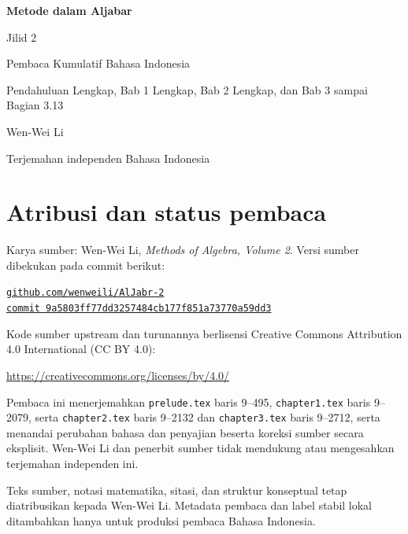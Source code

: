 \documentclass[
  colors=true,
  fontsetup=font-setup-id.tex,
  titlesetup=titles-setup.tex
]{AJbook2}
\theoremstyle{plain}
\theoremstyle{nonumberplain}
\numberwithin{equation}{section}
\numberwithin{figure}{section}
\begin{document}
\begin{titlepage}
  \centering
  \vspace*{0.16\textheight}
  {\Huge\bfseries Metode dalam Aljabar\par}
  \vspace{0.8em}
  {\LARGE Jilid 2\par}
  \vspace{1.8em}
  {\Large Pembaca Kumulatif Bahasa Indonesia\par}
  \vspace{0.6em}
  {\large Pendahuluan Lengkap, Bab 1 Lengkap, Bab 2 Lengkap, dan Bab 3 sampai Bagian 3.13\par}
  \vfill
  {\Large Wen-Wei Li\par}
  \vspace{0.6em}
  {\normalsize Terjemahan independen Bahasa Indonesia\par}
  \vspace*{0.10\textheight}
\end{titlepage}

\cleardoublepage
\thispagestyle{empty}
\section*{Atribusi dan status pembaca}
Karya sumber: Wen-Wei Li, \emph{Methods of Algebra, Volume 2}. Versi
sumber dibekukan pada commit berikut:
\begin{center}
  \small
  \href{https://github.com/wenweili/AlJabr-2}{\texttt{github.com/wenweili/AlJabr-2}}\\
  \href{https://github.com/wenweili/AlJabr-2/commit/9a5803ff77dd3257484cb177f851a73770a59dd3}{\texttt{commit 9a5803ff77dd3257484cb177f851a73770a59dd3}}
\end{center}
Kode sumber upstream dan turunannya berlisensi Creative Commons
Attribution 4.0 International (CC BY 4.0):
\begin{center}
  \small\url{https://creativecommons.org/licenses/by/4.0/}
\end{center}
Pembaca ini menerjemahkan
\texttt{prelude.tex} baris 9--495, \texttt{chapter1.tex} baris 9--2079,
serta \texttt{chapter2.tex} baris 9--2132 dan \texttt{chapter3.tex} baris
9--2712, serta menandai perubahan bahasa dan penyajian beserta koreksi sumber
secara eksplisit. Wen-Wei Li dan penerbit sumber tidak mendukung atau
mengesahkan terjemahan independen ini.

\medskip
Teks sumber, notasi matematika, sitasi, dan struktur konseptual tetap
diatribusikan kepada Wen-Wei Li. Metadata pembaca dan label stabil lokal
ditambahkan hanya untuk produksi pembaca Bahasa Indonesia.
\end{document}
